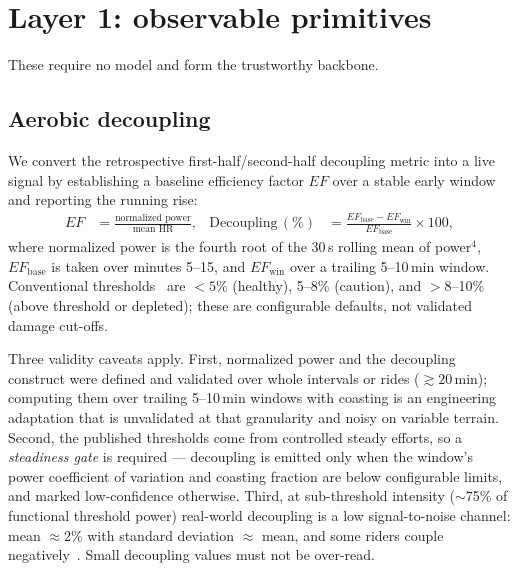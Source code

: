 \documentclass[11pt]{article}
\begin{document}
\section{Layer 1: observable primitives}\label{sec:layer1}

These require no model and form the trustworthy backbone.

\subsection{Aerobic decoupling}\label{sec:decoupling}
We convert the retrospective first-half/second-half decoupling metric into a live signal by establishing a baseline efficiency factor $EF$ over a stable early window and reporting the running rise:
\begin{align}
EF &= \frac{\text{normalized power}}{\text{mean HR}}, &
\text{Decoupling}\,(\%) &= \frac{EF_{\text{base}} - EF_{\text{win}}}{EF_{\text{base}}}\times 100,
\label{eq:decoupling}
\end{align}
where normalized power is the fourth root of the 30\,s rolling mean of power$^4$, $EF_{\text{base}}$ is taken over minutes 5--15, and $EF_{\text{win}}$ over a trailing 5--10\,min window. Conventional thresholds~\cite{trainingpeaks} are ${<}5\%$ (healthy), 5--8\% (caution), and ${>}8$--10\% (above threshold or depleted); these are configurable defaults, not validated damage cut-offs.

Three validity caveats apply. First, normalized power and the decoupling construct were defined and validated over whole intervals or rides ($\gtrsim 20$\,min); computing them over trailing 5--10\,min windows with coasting is an engineering adaptation that is unvalidated at that granularity and noisy on variable terrain. Second, the published thresholds come from controlled steady efforts, so a \emph{steadiness gate} is required --- decoupling is emitted only when the window's power coefficient of variation and coasting fraction are below configurable limits, and marked low-confidence otherwise. Third, at sub-threshold intensity ($\sim$75\% of functional threshold power) real-world decoupling is a low signal-to-noise channel: mean $\approx 2\%$ with standard deviation $\approx$ mean, and some riders couple negatively~\cite{barsumyan}. Small decoupling values must not be over-read.
\end{document}
